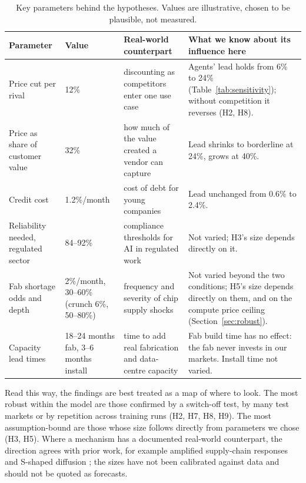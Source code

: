 \documentclass[11pt]{article}
\begin{document}
\begin{table}[h]
\centering
\scriptsize
\renewcommand{\arraystretch}{1.2}
\begin{tabularx}{\linewidth}{>{\raggedright\arraybackslash}p{3.0cm}lLL}
\toprule
Parameter & Value & Real-world counterpart & What we know about its influence here \\
\midrule
Price cut per rival & 12\% & discounting as competitors enter one use case & Agents' lead holds from 6\% to 24\% (Table~\ref{tab:sensitivity}); without competition it reverses (H2, H8). \\
Price as share of customer value & 32\% & how much of the value created a vendor can capture & Lead shrinks to borderline at 24\%, grows at 40\%. \\
Credit cost & 1.2\%/month & cost of debt for young companies & Lead unchanged from 0.6\% to 2.4\%. \\
Reliability needed, regulated sector & 84--92\% & compliance thresholds for AI in regulated work & Not varied; H3's size depends directly on it. \\
Fab shortage odds and depth & 2\%/month, 30--60\% (crunch 6\%, 50--80\%) & frequency and severity of chip supply shocks & Not varied beyond the two conditions; H5's size depends directly on them, and on the compute price ceiling (Section~\ref{sec:robust}). \\
Capacity lead times & 18--24 months fab, 3--6 months install & time to add real fabrication and data-centre capacity & Fab build time has no effect: the fab never invests in our markets. Install time not varied. \\
\bottomrule
\end{tabularx}
\caption{Key parameters behind the hypotheses. Values are illustrative, chosen to be plausible, not measured.}
\label{tab:params}
\end{table}

Read this way, the findings are best treated as a map of where to look. The most robust within the model are those confirmed by a switch-off test, by many test markets or by repetition across training runs (H2, H7, H8, H9). The most assumption-bound are those whose size follows directly from parameters we chose (H3, H5). Where a mechanism has a documented real-world counterpart, the direction agrees with prior work, for example amplified supply-chain responses \citep{lee1997bullwhip,sterman1989misperceptions} and S-shaped diffusion \citep{bass1969diffusion}; the sizes have not been calibrated against data and should not be quoted as forecasts.
\end{document}
